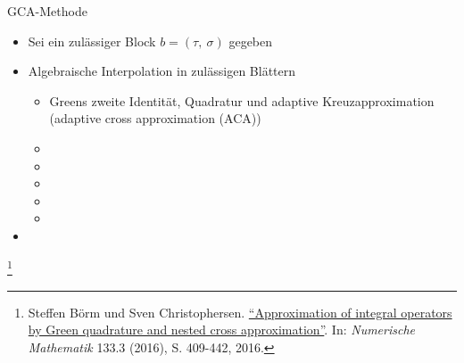 \documentclass[10pt]{beamer}
\let\svthefootnote\thefootnote
\begin{document}
\begin{frame}{GCA-Methode}
  \begin{itemize}
    \item Sei ein zulässiger Block \(b = (\tau, \ \sigma)\) gegeben
    \item Algebraische Interpolation in zulässigen Blättern
    \begin{itemize}
      \item Greens zweite Identität, Quadratur und adaptive Kreuzapproximation
            (adaptive cross approximation (ACA))
      \item {}
      \item {}
      \item {}
      \item {}
      \item {}
    \end{itemize}
    \item {}
  \end{itemize}

  \footnotesize
  \let\thefootnote\relax\footnote{Steffen Börm und Sven Christophersen.
  \href{https://link.springer.com/article/10.1007\%2Fs00211-015-0757-y}{
  ``Approximation of integral operators by Green quadrature and nested cross 
  approximation''}. In:   \textit{Numerische Mathematik} 133.3 (2016), S. 
  409-442, 2016.}
  \addtocounter{footnote}{-1}\let\thefootnote\svthefootnote\relax
  \normalsize
\end{frame}
\end{document}

